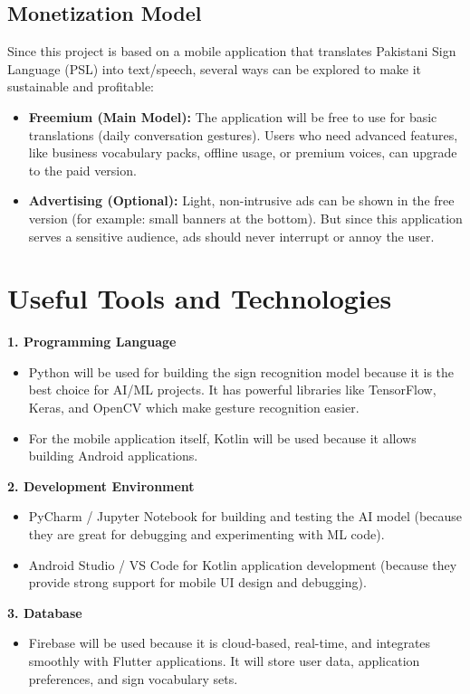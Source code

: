 \documentclass[12pt,a4paper,oneside]{report}
\begin{document}
\subsection{Monetization Model}

Since this project is based on a mobile application that translates Pakistani Sign Language (PSL) into text/speech, several ways can be explored to make it sustainable and profitable:

\begin{itemize}
  \item \textbf{Freemium (Main Model):} The application will be free to use for basic translations (daily conversation gestures). Users who need advanced features, like business vocabulary packs, offline usage, or premium voices, can upgrade to the paid version.
  \item \textbf{Advertising (Optional):} Light, non-intrusive ads can be shown in the free version (for example: small banners at the bottom). But since this application serves a sensitive audience, ads should never interrupt or annoy the user.
\end{itemize}

\section{Useful Tools and Technologies}

\textbf{1. Programming Language}
\begin{itemize}
  \item Python will be used for building the sign recognition model because it is the best choice for AI/ML projects. It has powerful libraries like TensorFlow, Keras, and OpenCV which make gesture recognition easier.
  \item For the mobile application itself, Kotlin will be used because it allows building Android applications.
\end{itemize}

\textbf{2. Development Environment}
\begin{itemize}
  \item PyCharm / Jupyter Notebook for building and testing the AI model (because they are great for debugging and experimenting with ML code).
  \item Android Studio / VS Code for Kotlin application development (because they provide strong support for mobile UI design and debugging).
\end{itemize}

\textbf{3. Database}
\begin{itemize}
  \item Firebase will be used because it is cloud-based, real-time, and integrates smoothly with Flutter applications. It will store user data, application preferences, and sign vocabulary sets.
\end{itemize}
\end{document}
